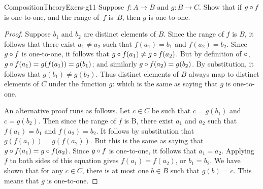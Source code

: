 \begin{example}{CompositionTheoryExers-g11} 
Suppose $f \colon A \to B$ and $g \colon B \to C$. Show that if $g \circ f$ is one-to-one, 
 and the range of~$f$ is~$B$, then $g$ is one-to-one. 

 \begin{proof}
Suppose $b_1$ and $b_2$ are distinct elements of $B$.  Since the range of $f$ is $B$, it follows that there exist $a_1 \neq a_2$ such that $f(a_1) = b_1$ and $f(a_2) = b_2$.  Since $g \circ f$ is one-to-one, it follows that $g \circ f(a_1) \neq g \circ f(a_2)$. But by definition of $\circ$, $g \circ f(a_1) = g(f(a_1)) = g(b_1)$; and similarly $g \circ f(a_2) =  g(b_2)$. By substitution, it follows that  $g(b_1) \neq g(b_2)$. Thus distinct elements of $B$ always map to distinct elements of $C$ under the function $g$: which is the same as saying that $g$ is one-to-one. 

An alternative proof runs as follows. Let $c \in C$ be such that $c =g(b_1)$  and $c= g(b_2)$. Then since the range of $f$ is B, there exist $a_1$ and  $a_2$ such that $f(a_1) = b_1$ and $f(a_2) = b_2$. It follows  by substitution that  $g(f(a_1)) = g(f(a_2))$. But this is the same as saying that $g \circ f(a_1) = g \circ f(a_2)$. Since  $g \circ f$ is one-to-one, it follows that $a_1 = a_2$. Applying $f$ to both sides of this equation gives $f(a_1) = f(a_2)$, or $b_1 = b_2$. We have shown that  for any $c \in  C$, there is at most one $b \in B$ such that $g(b) = c$. This means that $g$ is one-to-one.
\end{proof}    
 \end{example}


